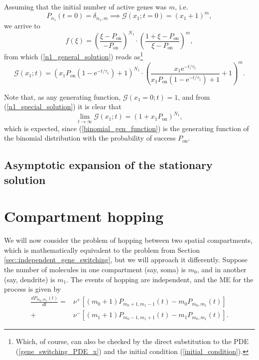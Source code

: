 \documentclass[a4paper, 11pt]{article}
\begin{document}
Assuming that the initial number of active genes was $m$, i.e.
\begin{equation}\label{initial_condition}
  P_{n_1}(t=0) = \delta_{n_1,m} \implies \mathcal G(x_1; t=0) = (x_1+1)^m,
\end{equation}
we arrive to
\begin{equation}
  f(\xi) = \left(\frac{\xi - P_\text{on}}{-P_{\text{on}}}\right)^{N_1}\cdot\left(\frac{1+\xi-P_\text{on}}{\xi-P_{\text{on}}}\right)^m,
\end{equation}
from which (\ref{n1_general_solution}) reads as\footnote{Which, of course, can also be checked by the direct substitution to the PDE (\ref{gene_switching_PDE_x}) and the initial condition (\ref{initial_condition}).}
\begin{equation}\label{n1_special_solution}
  \mathcal G(x_1; t) = \left(x_1P_\text{on}\left(1-\mathrm e^{-t/\tau_1}\right)+1\right)^{N_1}\cdot\left(\frac{x_1\mathrm e^{-t/\tau_1}}{x_1P_\text{on}\left(1-\mathrm e^{-t/\tau_1}\right)+1} + 1\right)^m.
\end{equation}


Note that, as any generating function, $\mathcal G(x_1=0; t)=1$, and from (\ref{n1_special_solution}) it is clear that
\begin{equation}\label{binomial_gen_function}
  \lim_{t\to\infty}\mathcal G(x_1; t) = \left(1 + x_1P_\text{on}\right)^{N_1},
\end{equation}
which is expected, since (\ref{binomial_gen_function}) is the generating function of the binomial distribution with the probability of success $P_\text{on}$.

\subsection{Asymptotic expansion of the stationary solution}

\section{Compartment hopping}
We will now consider the problem of hopping between two spatial compartments, which is mathematically equivalent to the problem from Section \ref{sec::independent_gene_switching}, but we will approach it differently. Suppose the number of molecules in one compartment (say, soma) is $m_0$, and in another (say, dendrite) is $m_1$. The events of hopping are independent, and the ME for the process is given by
\begin{equation}
  \begin{split}
    \frac{dP_{m_0, m_1}(t)}{dt} = &\nu^+\left[(m_0+1)P_{m_0+1,m_1-1}(t)-m_0P_{m_0,m_1}(t)\right]\\ + &\nu^-\left[(m_1+1)P_{m_0-1, m_1+1}(t) - m_1P_{m_0, m_1}(t)\right].
  \end{split}
\end{equation}
\end{document}
